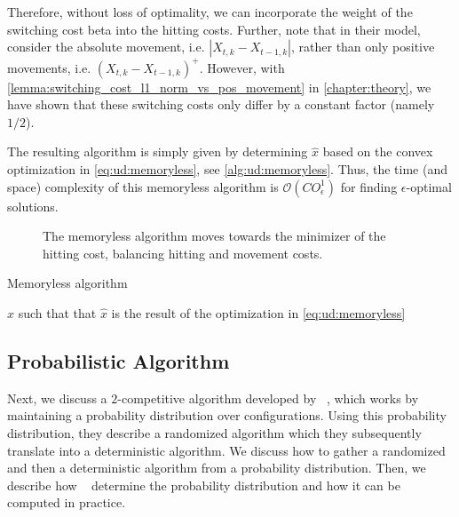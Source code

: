 Therefore, without loss of optimality, we can incorporate the weight of the switching cost beta into the hitting costs. Further, note that in their model, \citeauthor*{Bansal2015}~\cite{Bansal2015} consider the absolute movement, i.e. $|X_{t,k} - X_{t-1,k}|$, rather than only positive movements, i.e. $(X_{t,k} - X_{t-1,k})^+$. However, with \cref{lemma:switching_cost_l1_norm_vs_pos_movement} in \cref{chapter:theory}, we have shown that these switching costs only differ by a constant factor (namely $1/2$).

The resulting algorithm is simply given by determining $\hat{x}$ based on the convex optimization in \cref{eq:ud:memoryless}, see \cref{alg:ud:memoryless}. Thus, the time (and space) complexity of this memoryless algorithm is $\mathcal{O}(C O_{\epsilon}^1)$ for finding $\epsilon$-optimal solutions.

\begin{figure}
    \centering
    
    \caption{The memoryless algorithm moves towards the minimizer of the hitting cost, balancing hitting and movement costs.}
    \label{fig:memoryless_algorithm}
\end{figure}

\begin{algorithm}
    \caption{Memoryless algorithm~\cite{Bansal2015}}\label{alg:ud:memoryless}
    \Return $\hat{x}$ such that that $\hat{x}$ is the result of the optimization in \cref{eq:ud:memoryless}\;
\end{algorithm}

\subsection{Probabilistic Algorithm}\label{section:online_algorithms:ud:probabilistic}

Next, we discuss a $2$-competitive algorithm developed by \citeauthor*{Bansal2015}~\cite{Bansal2015}, which works by maintaining a probability distribution over configurations. Using this probability distribution, they describe a randomized algorithm which they subsequently translate into a deterministic algorithm. We discuss how to gather a randomized and then a deterministic algorithm from a probability distribution. Then, we describe how \citeauthor*{Bansal2015}~\cite{Bansal2015} determine the probability distribution and how it can be computed in practice.

